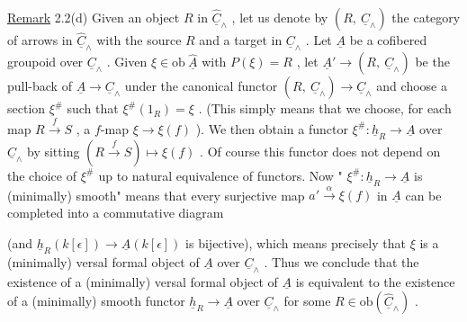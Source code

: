 \underline{Remark} 2.2(d)  Given an object  $R$  in  $\widehat{\underline{C}}_\wedge$ , let us denote by  $(R,\ \underline{C}_\wedge)$  the category of arrows in  $\widehat{\underline{C}}_\wedge$  with the source  $R$  and a target in  $\underline{C}_\wedge$ . Let  $\underline{A}$  be a cofibered groupoid over  $\underline{C}_\wedge$ . Given  $\xi \in \mathrm{ob}\ \widehat{\underline{A}}$  with  $P(\xi) = R$ , let  $\underline{A}' \longrightarrow (R,\ \underline{C}_\wedge)$  be the pull-back of  $\underline{A} \longrightarrow \underline{C}_\wedge$  under the canonical functor  $(R,\ \underline{C}_\wedge) \longrightarrow \underline{C}_\wedge$  and choose a section  $\xi^{\#}$  such that  $\xi^{\#}(1_R) = \xi$ . (This simply means that we choose, for each map  $R \xrightarrow{\ f\ } S$ , a $f$-map  $\xi \longrightarrow \xi(f)$ ). We then obtain a functor  $\xi^{\#} : \underline{h}_R \longrightarrow \underline{A}$  over  $\underline{C}_\wedge$  by sitting  $(R \xrightarrow{\ f\ } S) \longmapsto \xi(f)$ . Of course this functor does not depend on the choice of  $\xi^{\#}$  up to natural equivalence of functors. Now  " $\xi^{\#} : \underline{h}_R \longrightarrow \underline{A}$  is (minimally) smooth"  means that every surjective map  $a' \xrightarrow{\ \alpha\ } \xi(f)$  in  $\underline{A}$  can be completed into a commutative diagram

\begin{center}
\end{center}
(and  $\underline{h}_R(k[\epsilon]) \longrightarrow \underline{A}(k[\epsilon])$   is bijective), which means precisely that  $\xi$  is a (minimally) versal formal object of  $\underline{A}$  over  $\underline{C}_\wedge$ . Thus we conclude that the existence of a (minimally) versal formal object of  $\underline{A}$  is equivalent to the existence of a (minimally) smooth functor  $\underline{h}_R \longrightarrow \underline{A}$  over  $\underline{C}_\wedge$  for some  $R \in \mathrm{ob}(\widehat{\underline{C}}_\wedge)$ .

